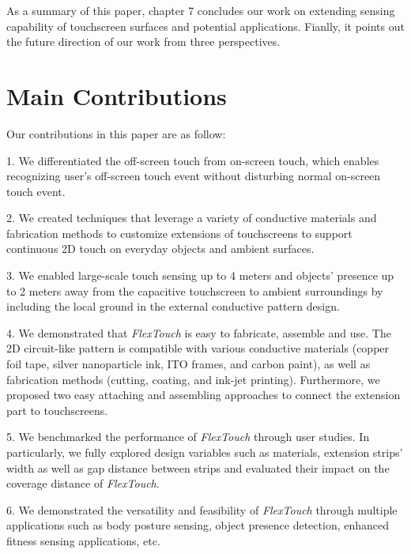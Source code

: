 As a summary of this paper, chapter 7 concludes our work on extending sensing capability of touchscreen surfaces and potential applications. Fianlly, it points out the future direction of our work from three perspectives.

\section{Main Contributions}
Our contributions in this paper are as follow:

1. We differentiated the off-screen touch from on-screen touch, which enables recognizing user's off-screen touch event without disturbing normal on-screen touch event. 

2. We created techniques that leverage a variety of conductive materials and fabrication methods to customize extensions of touchscreens to support continuous 2D touch on everyday objects and ambient surfaces.

3. We enabled large-scale touch sensing up to 4 meters and objects' presence up to 2 meters away from the capacitive touchscreen to ambient surroundings by including the local ground in the external conductive pattern design. 

4. We demonstrated that \textit{FlexTouch} is easy to fabricate, assemble and use. The 2D circuit-like pattern is compatible with various conductive materials (copper foil tape, silver nanoparticle ink, ITO frames, and carbon paint), as well as fabrication methods (cutting, coating, and ink-jet printing). Furthermore, we proposed two easy attaching and assembling approaches to connect the extension part to touchscreens. 

5. We benchmarked the performance of \textit{FlexTouch} through user studies. In particularly, we fully explored design variables such as materials, extension strips' width as well as gap distance between strips and evaluated their impact on the coverage distance of \textit{FlexTouch}. 

6. We demonstrated the versatility and feasibility of \textit{FlexTouch} through multiple applications such as body posture sensing, object presence detection, enhanced fitness sensing applications, etc.

